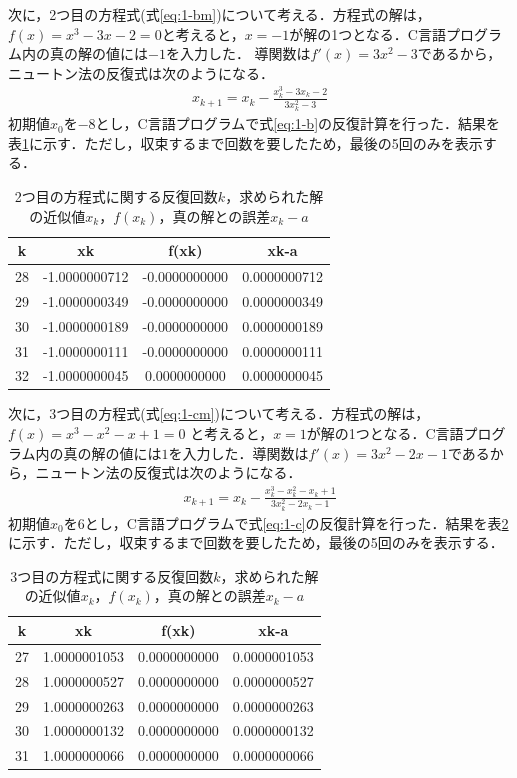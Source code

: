 \documentclass[12pt]{jarticle}
\renewcommand  \[  {\begin{eqnarray}}
\renewcommand  \]  {\end{eqnarray}}
\begin{document}
次に，2つ目の方程式(式\ref{eq:1-bm})について考える．方程式の解は，$f(x)=x^3-3x-2=0$と考えると，$x=-1$が解の1つとなる．C言語プログラム内の真の解の値には$-1$を入力した．
導関数は$f\prime(x)=3x^2-3$であるから，ニュートン法の反復式は次のようになる．
\[
\label{eq:1-b}
x_{k+1}=x_k- \frac{x_k^3-3x_k-2}{3x_k^2-3}
\]
初期値$x_0$を$-8$とし，C言語プログラムで式\ref{eq:1-b}の反復計算を行った．結果を表\ref{tab:1-b}に示す．ただし，収束するまで回数を要したため，最後の5回のみを表示する．
\begin{table}[t]
 \caption{2つ目の方程式に関する反復回数$k$，求められた解の近似値$x_k$，$f(x_k)$，真の解との誤差\textbar $x_k-a$\textbar}
 \label{tab:1-b}
 \center
\begin{tabular}{|c|c|c|c|}
\hline
k & xk & f(xk) & xk-a\\
\hline
28  & -1.0000000712 & -0.0000000000 & 0.0000000712\\
29  & -1.0000000349 & -0.0000000000 & 0.0000000349\\
30  & -1.0000000189 & -0.0000000000 & 0.0000000189\\
31  & -1.0000000111 & -0.0000000000 & 0.0000000111\\
32  & -1.0000000045 & 0.0000000000 & 0.0000000045\\
\hline
 \end{tabular}
\end{table}


次に，3つ目の方程式(式\ref{eq:1-cm})について考える．方程式の解は，$f(x)=x^3-x^2-x+1=0$
と考えると，$x=1$が解の1つとなる．C言語プログラム内の真の解の値には$1$を入力した．導関数は$f\prime(x)=3x^2-2x-1$であるから，ニュートン法の反復式は次のようになる．
\[
\label{eq:1-c}
x_{k+1}=x_k- \frac{x_k^3-x_k^2-x_k+1}{3x_k^2-2x_k-1}
\]
初期値$x_0$を$6$とし，C言語プログラムで式\ref{eq:1-c}の反復計算を行った．結果を表\ref{tab:1-c}に示す．ただし，収束するまで回数を要したため，最後の5回のみを表示する．
\begin{table}[t]
 \caption{3つ目の方程式に関する反復回数$k$，求められた解の近似値$x_k$，$f(x_k)$，真の解との誤差\textbar $x_k-a$\textbar}
 \label{tab:1-c}
 \center
\begin{tabular}{|c|c|c|c|}
\hline
k & xk & f(xk) & xk-a \\
\hline
27  & 1.0000001053 & 0.0000000000 & 0.0000001053\\
28  & 1.0000000527 & 0.0000000000 & 0.0000000527\\
29  & 1.0000000263 & 0.0000000000 & 0.0000000263\\
30  & 1.0000000132 & 0.0000000000 & 0.0000000132\\
31  & 1.0000000066 & 0.0000000000 & 0.0000000066\\
\hline
 \end{tabular}
\end{table}
\end{document}
